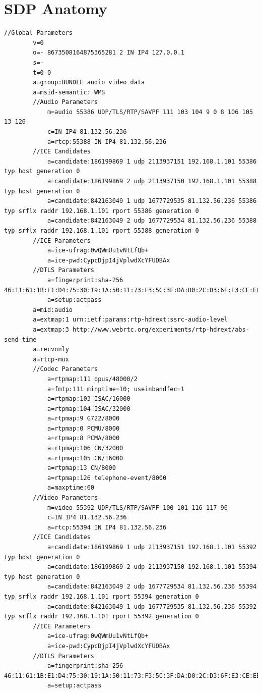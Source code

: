 \documentclass[]{report}
\begin{document}
	\chapter{SDP Anatomy}
	\begin{lstlisting}[tabsize=1,frame=single, basicstyle=\ttfamily\footnotesize, breaklines=true]
	//Global Parameters
		v=0
		o=- 8673508164875365281 2 IN IP4 127.0.0.1
		s=-
		t=0 0
		a=group:BUNDLE audio video data
		a=msid-semantic: WMS
		//Audio Parameters
			m=audio 55386 UDP/TLS/RTP/SAVPF 111 103 104 9 0 8 106 105 13 126
			c=IN IP4 81.132.56.236
			a=rtcp:55388 IN IP4 81.132.56.236
		//ICE Candidates
			a=candidate:186199869 1 udp 2113937151 192.168.1.101 55386 typ host generation 0
			a=candidate:186199869 2 udp 2113937150 192.168.1.101 55388 typ host generation 0
			a=candidate:842163049 1 udp 1677729535 81.132.56.236 55386 typ srflx raddr 192.168.1.101 rport 55386 generation 0
			a=candidate:842163049 2 udp 1677729534 81.132.56.236 55388 typ srflx raddr 192.168.1.101 rport 55388 generation 0
		//ICE Parameters
			a=ice-ufrag:0wQWmUu1vNtLfQb+
			a=ice-pwd:CypcDjpI4jVplwdXcYFUDBAx
		//DTLS Parameters
			a=fingerprint:sha-256 46:11:61:1B:E1:D4:75:30:19:1A:50:11:73:F3:5C:3F:DA:D0:2C:D3:6F:E3:CE:EB:1E:13:94:12:00:71:51:60
			a=setup:actpass
		a=mid:audio
		a=extmap:1 urn:ietf:params:rtp-hdrext:ssrc-audio-level
		a=extmap:3 http://www.webrtc.org/experiments/rtp-hdrext/abs-send-time
		a=recvonly
		a=rtcp-mux
		//Codec Parameters
			a=rtpmap:111 opus/48000/2
			a=fmtp:111 minptime=10; useinbandfec=1
			a=rtpmap:103 ISAC/16000
			a=rtpmap:104 ISAC/32000
			a=rtpmap:9 G722/8000
			a=rtpmap:0 PCMU/8000
			a=rtpmap:8 PCMA/8000
			a=rtpmap:106 CN/32000
			a=rtpmap:105 CN/16000
			a=rtpmap:13 CN/8000
			a=rtpmap:126 telephone-event/8000
			a=maxptime:60
		//Video Parameters
			m=video 55392 UDP/TLS/RTP/SAVPF 100 101 116 117 96
			c=IN IP4 81.132.56.236
			a=rtcp:55394 IN IP4 81.132.56.236
		//ICE Candidates
			a=candidate:186199869 1 udp 2113937151 192.168.1.101 55392 typ host generation 0
			a=candidate:186199869 2 udp 2113937150 192.168.1.101 55394 typ host generation 0
			a=candidate:842163049 2 udp 1677729534 81.132.56.236 55394 typ srflx raddr 192.168.1.101 rport 55394 generation 0
			a=candidate:842163049 1 udp 1677729535 81.132.56.236 55392 typ srflx raddr 192.168.1.101 rport 55392 generation 0
		//ICE Parameters
			a=ice-ufrag:0wQWmUu1vNtLfQb+
			a=ice-pwd:CypcDjpI4jVplwdXcYFUDBAx
		//DTLS Parameters
			a=fingerprint:sha-256 46:11:61:1B:E1:D4:75:30:19:1A:50:11:73:F3:5C:3F:DA:D0:2C:D3:6F:E3:CE:EB:1E:13:94:12:00:71:51:60
			a=setup:actpass

\end{lstlisting}
\end{document}
